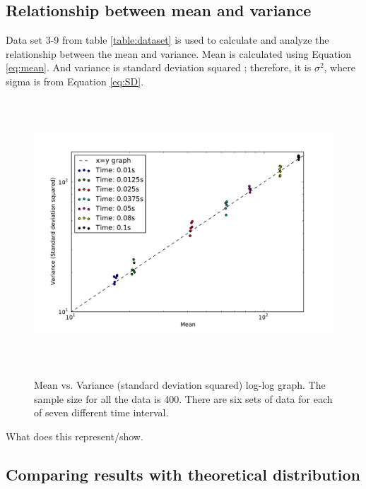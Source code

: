 \documentclass[a4paper,12pt]{article}
\begin{document}
\subsection{Relationship between mean and variance}
\label{sec:meanandvariance}
Data set 3-9 from table \ref{table:dataset} is used to calculate and analyze the relationship between the mean and variance. Mean is calculated using Equation \ref{eq:mean}. And variance is standard deviation squared \citep{Stat}; therefore, it is $\sigma^{2}$, where sigma is from Equation \ref{eq:SD}. 

\begin{figure}[H]
\centering
\centering
\includegraphics[angle=0,height=10cm,width=15.5cm]{graphs/Task7_log-log.pdf}
\label{fig:task7_log}
\caption{Mean vs. Variance (standard deviation squared) log-log graph. The sample size for all the data is 400. There are six sets of data for each of seven different time interval.}
\end{figure}
What does this represent/show.

\subsection{Comparing results with theoretical distribution}
\label{sec:theoretical}
\end{document}
